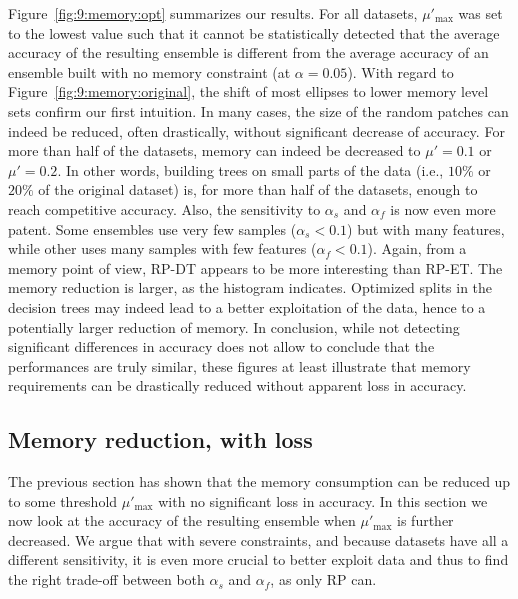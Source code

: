 Figure~\ref{fig:9:memory:opt} summarizes our results. For all datasets, $\mu'_{\text{max}}$
was set to the lowest value such that it cannot be statistically detected that
the average accuracy of the resulting ensemble is different from the average
accuracy of an ensemble built with no memory constraint (at $\alpha=0.05$). With
regard to Figure~\ref{fig:9:memory:original}, the shift of most ellipses to lower
memory level sets confirm our first intuition. In many cases, the size of the
random patches can indeed be reduced, often drastically, without significant
decrease of accuracy. For more than half of the datasets, memory can indeed be
decreased to $\mu'=0.1$ or $\mu'=0.2$. In other words, building trees on small parts
of the data (i.e., $10\%$ or $20\%$ of the original dataset) is, for more than
half of the datasets, enough to reach competitive accuracy. Also, the
sensitivity to $\alpha_s$ and $\alpha_f$ is now even more patent. Some ensembles use very
few samples ($\alpha_s < 0.1$) but with many features, while other uses many samples
with few features ($\alpha_f < 0.1$). Again, from a memory point of view, RP-DT
appears to be more interesting than RP-ET. The memory reduction is larger, as
the histogram indicates. Optimized splits in the decision trees may indeed lead
to a better exploitation of the data, hence to a potentially larger reduction of
memory. In conclusion, while not detecting significant differences in accuracy
does not allow to conclude that the performances are truly similar, these
figures at least illustrate that memory requirements can be drastically reduced
without apparent loss in accuracy.

\subsection{Memory reduction, with loss}
\label{sec:9:memory:loss}

The previous section has shown that the memory consumption can be reduced up to
some threshold $\mu'_{\text{max}}$ with no significant loss in accuracy. In this section we
now look at the accuracy of the resulting ensemble when $\mu'_{\text{max}}$ is further
decreased. We argue that with severe constraints, and because datasets have all a
different sensitivity, it is even more crucial to better exploit data and thus
to find the right trade-off between both $\alpha_s$ and $\alpha_f$, as only RP can.

